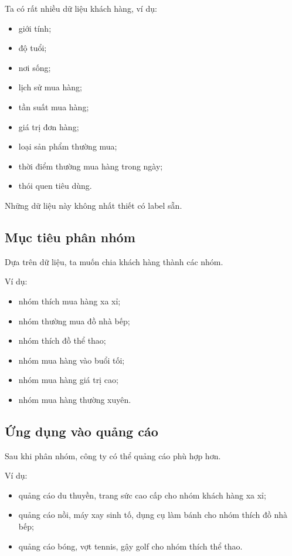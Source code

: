 Ta có rất nhiều dữ liệu khách hàng, ví dụ:

\begin{itemize}
    \item giới tính;
    \item độ tuổi;
    \item nơi sống;
    \item lịch sử mua hàng;
    \item tần suất mua hàng;
    \item giá trị đơn hàng;
    \item loại sản phẩm thường mua;
    \item thời điểm thường mua hàng trong ngày;
    \item thói quen tiêu dùng.
\end{itemize}

Những dữ liệu này không nhất thiết có label sẵn.

\subsection{Mục tiêu phân nhóm}

Dựa trên dữ liệu, ta muốn chia khách hàng thành các nhóm.

Ví dụ:

\begin{itemize}
    \item nhóm thích mua hàng xa xỉ;
    \item nhóm thường mua đồ nhà bếp;
    \item nhóm thích đồ thể thao;
    \item nhóm mua hàng vào buổi tối;
    \item nhóm mua hàng giá trị cao;
    \item nhóm mua hàng thường xuyên.
\end{itemize}

\subsection{Ứng dụng vào quảng cáo}

Sau khi phân nhóm, công ty có thể quảng cáo phù hợp hơn.

Ví dụ:

\begin{itemize}
    \item quảng cáo du thuyền, trang sức cao cấp cho nhóm khách hàng xa xỉ;
    \item quảng cáo nồi, máy xay sinh tố, dụng cụ làm bánh cho nhóm thích đồ nhà bếp;
    \item quảng cáo bóng, vợt tennis, gậy golf cho nhóm thích thể thao.
\end{itemize}

